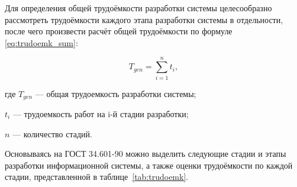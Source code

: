 Для определения общей трудоёмкости разработки системы целесообразно рассмотреть трудоёмкости каждого этапа разработки системы в отдельности, после чего произвести расчёт общей трудоёмкости по формуле \ref{eq:trudoemk_sum}:

\begin{equation}
	\label{eq:trudoemk_sum}
	T_{gen} = \sum^{n}_{i=1}t_{i},
\end{equation}
\begin{ESKDexplanation}
	\item где $T_{gen}$ --- общая трудоемкость разработки системы;
	\item $t_{i}$ --- трудоемкость работ на i-й стадии разработки;
	\item $n$ --- количество стадий.
\end{ESKDexplanation}

Основываясь на ГОСТ 34.601-90\cite{gost34601} можно выделить следующие стадии и этапы разработки информационной системы, а также оценки трудоёмкости по каждой стадии, представленной в таблице~\ref{tab:trudoemk}.

